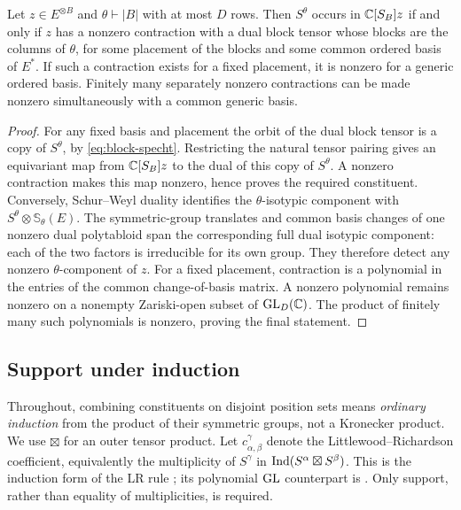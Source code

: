 \begin{lemma}\label{lem:dual-test}
Let $z\in E^{\otimes B}$ and $\theta\vdash |B|$ with at most $D$ rows.
Then $S^\theta$ occurs in $\mathbb C[S_B]z$ if and only if $z$ has a nonzero
contraction with a dual block tensor whose blocks are the columns of
$\theta$, for some placement of the blocks and some common ordered
basis of $E^*$.
If such a contraction exists for a fixed placement, it is nonzero for
a generic ordered basis. Finitely many separately nonzero contractions
can be made nonzero simultaneously with a common generic basis.
\end{lemma}

\begin{proof}
For any fixed basis and placement the orbit of the dual block tensor
is a copy of $S^\theta$, by \eqref{eq:block-specht}.
Restricting the natural tensor pairing gives an equivariant map from
$\mathbb C[S_B]z$ to the dual of this copy of $S^\theta$.
A nonzero contraction makes this map nonzero, hence proves the required
constituent.
Conversely, Schur--Weyl duality
\cite[Appendix~A, (5.5$'$), (5.6), and (8.2)]{Macdonald}
identifies the $\theta$-isotypic
component with $S^\theta\otimes\mathbb S_\theta(E)$.
The symmetric-group translates and common basis changes of one
nonzero dual polytabloid span the corresponding full dual isotypic
component: each of the two factors is irreducible for its own group.
They therefore detect any nonzero $\theta$-component of $z$.
For a fixed placement, contraction is a polynomial in the entries of
the common change-of-basis matrix. A nonzero polynomial remains
nonzero on a nonempty Zariski-open subset of $\operatorname{GL}_D(\mathbb C)$.
The product of finitely many such polynomials is nonzero, proving
the final statement.
\end{proof}

\subsection{Support under induction}

Throughout, combining constituents on disjoint position sets means
\emph{ordinary induction} from the product of their symmetric groups,
not a Kronecker product. We use $\boxtimes$ for an outer tensor product.
Let $c_{\alpha,\beta}^{\gamma}$ denote the Littlewood--Richardson
coefficient, equivalently the multiplicity of $S^\gamma$ in
$\operatorname{Ind}(S^\alpha\boxtimes S^\beta)$.
This is the induction form of the LR rule
\cite[Rule~16.4]{James}; its polynomial $\operatorname{GL}$ counterpart is
\cite[Appendix~A, (6.1)]{Macdonald}.
Only support, rather than equality of multiplicities, is required.

